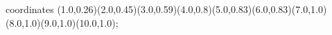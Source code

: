 					coordinates { (1.0,0.26)(2.0,0.45)(3.0,0.59)(4.0,0.8)(5.0,0.83)(6.0,0.83)(7.0,1.0)(8.0,1.0)(9.0,1.0)(10.0,1.0)};